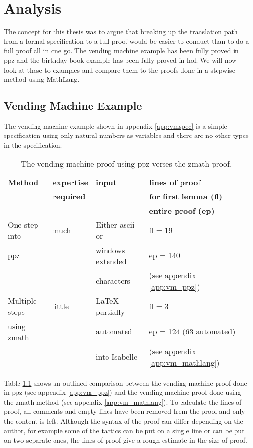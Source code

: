 \chapter{Analysis}
\label{ch:analysis}

The concept for this thesis was to argue that breaking up the translation path from a formal specification to a full proof would be easier to conduct than to do a full proof all in one go. The vending machine example has been fully proved in \gls{ppz} and the birthday book example has been fully proved in \gls{hol}. We will now look at these to examples and compare them to the proofs done in a stepwise method using MathLang.

\section{Vending Machine Example}

The vending machine example shown in appendix \ref{app:vmspec} is a simple specification using only natural numbers as variables and there are no other types in the specification. 

\begin{table}[H]
\begin{center}
\begin{tabular}{| l || l | l | l | l |}
\hline
\textbf{Method} & \textbf{expertise} &  \textbf{input} & \textbf{lines of proof}  \\
& \textbf{required} & & \textbf{for first lemma (fl)}  \\
& & & \textbf{entire proof (ep)} \\
\hline
One step into & much & Either ascii or & fl = 19  \\
\gls{ppz} & & windows extended & ep = 140 \\
& & characters & (see appendix \ref{app:vm_ppz})\\
\hline
Multiple steps & little & \LaTeX{} partially & fl = 3  \\
using \gls{zmath} & & automated & ep = 124 (63 automated) \\
& & into Isabelle & (see appendix \ref{app:vm_mathlang}) \\
\hline
\end{tabular}
\end{center}
\caption{The vending machine proof using \gls{ppz} verses the \gls{zmath} proof.}
\label{tab:comparevm}
\end{table}

Table \ref{tab:comparevm} shows an outlined comparison between the vending machine proof done in \gls{ppz} (see appendix \ref{app:vm_ppz}) and the vending machine proof done using the \gls{zmath} method (see appendix \ref{app:vm_mathlang}). To calculate the lines of proof, all comments and empty lines have been removed from the proof and only the content is left. Although the syntax of the proof can differ depending on the author, for example some of the tactics can be put on a single line or can be put on two separate ones, the lines of proof give a rough estimate in the size of  proof.

